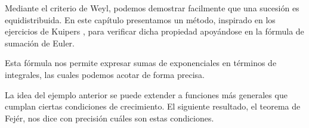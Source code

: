 Mediante el criterio de Weyl, podemos demostrar facilmente que una sucesión es equidistribuida.
En este capítulo presentamos un método, inspirado en los ejercicios de Kuipers 
\cite[Ejercicios 2.21--2.22]{kuipers-1974}, para verificar dicha propiedad apoyándose en la fórmula de sumación de Euler. 

Esta fórmula nos permite expresar sumas de exponenciales en términos de integrales, las
cuales podemos acotar de forma precisa.








La idea del ejemplo anterior se puede extender a funciones más generales que cumplan 
ciertas condiciones de crecimiento. El siguiente resultado, el teorema de Fejér, 
nos dice con precisión cuáles son estas condiciones.








